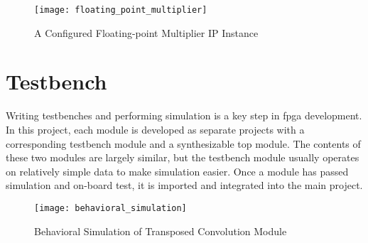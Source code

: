 \begin{figure}[h]
  \centering
  \texttt{[image: floating\_point\_multiplier]}
  \caption{A Configured Floating-point Multiplier IP Instance}
  \label{fig:floating_point_multiplier}
\end{figure}

\section{Testbench}

Writing testbenches and performing simulation is a key step in \gls{fpga} development. In this project,
each module is developed as separate projects with a corresponding testbench module and a synthesizable
top module. The contents of these two modules are largely similar, but the testbench module usually operates
on relatively simple data to make simulation easier. Once a module has passed simulation and on-board test,
it is imported and integrated into the main project.

\begin{figure}[h]
  \centering
  \texttt{[image: behavioral\_simulation]}
  \caption{Behavioral Simulation of Transposed Convolution Module}
  \label{fig:behavioral_simulation}
\end{figure}

\clearpage %
